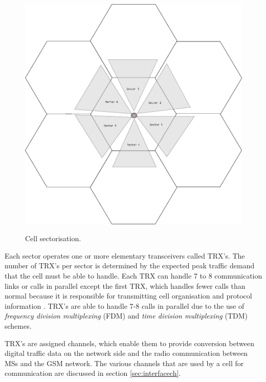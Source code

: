 \begin{figure}[t!]
	\begin{centering}
	\includegraphics[scale=0.75]{tikz-pics/cellsector.pdf}
	\label{fig:cellsector}
	\caption[Cell Sectorization]{Cell sectorisation\cite{GSMSysEngin}.}
	\end{centering}
\end{figure}

Each sector operates one or more elementary transceivers called TRX’s. The number of TRX’s per sector is determined by the expected peak traffic demand that the cell must be able to handle. Each TRX can handle 7 to 8 communication links or calls in parallel except the first TRX, which handles fewer calls than normal because it is responsible for transmitting cell organisation and protocol information \cite{Eisenblatter}. TRX’s are able to handle 7-8 calls in parallel due to the use of \emph{frequency division multiplexing} (FDM) and \emph{time division multiplexing} (TDM) schemes. 

TRX’s are assigned channels, which enable them to provide conversion between digital traffic data on the network side and the radio communication between MSs and the GSM network\cite{ACOvsEA,FAPOrientationModel}. The various channels that are used by a cell for communication are discussed in section \ref{sec:interfacech}.

